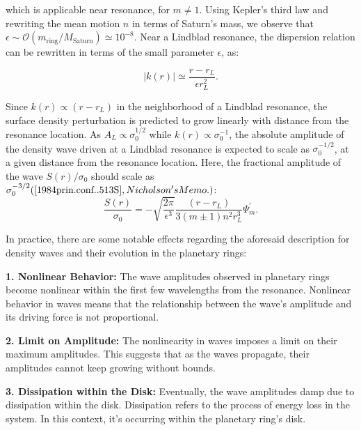 \documentclass{article}
\begin{document}
which is applicable near resonance, for $m \neq 1$. Using Kepler's third law and rewriting the mean motion $n$ in terms of Saturn's mass, we observe that $\epsilon \sim \mathcal{O} \left({m_{\text{ring}}}/{M_{\text{Saturn}}}\right) \simeq 10^{-8}$. Near a Lindblad resonance, the dispersion relation can be rewritten in terms of the small parameter $\epsilon$, as:

\begin{equation}
    |k(r)| \simeq \frac{r - r_{L}}{\epsilon r_{L}^{2}}.
\end{equation}

Since $k(r) \propto (r - r_{L})$ in the neighborhood of a Lindblad resonance, the surface density perturbation is predicted to grow linearly with distance from the resonance location. As $A_{L} \propto \sigma_{0}^{1/2}$ while $k(r) \propto \sigma_{0}^{-1}$, the absolute amplitude of the density wave driven at a Lindblad resonance is expected to scale as $\sigma_{0}^{-1/2}$, at a given distance from the resonance location. Here, the fractional amplitude of the wave $S(r)/\sigma_{0}$ should scale as $\sigma_{0}^{-3/2} (\cite{1984prin.conf..513S}, Nicholson's Memo.)$:
\begin{equation}
    \frac{S(r)}{\sigma_{0}} = - \sqrt{\frac{2\pi}{\epsilon^{3}}} \frac{(r - r_{L})}{3(m \pm 1) n^{2} r_{L}^{3}} \Psi_{m}^{'}.
\end{equation}

In practice, there are some notable effects regarding the aforesaid description for density waves and their evolution in the planetary rings:

\textbf{1. Nonlinear Behavior:} The wave amplitudes observed in planetary rings become nonlinear within the first few wavelengths from the resonance. Nonlinear behavior in waves means that the relationship between the wave's amplitude and its driving force is not proportional.

\textbf{2. Limit on Amplitude:} The nonlinearity in waves imposes a limit on their maximum amplitudes. This suggests that as the waves propagate, their amplitudes cannot keep growing without bounds.

\textbf{3. Dissipation within the Disk:} Eventually, the wave amplitudes damp due to dissipation within the disk. Dissipation refers to the process of energy loss in the system. In this context, it's occurring within the planetary ring's disk.
\end{document}
